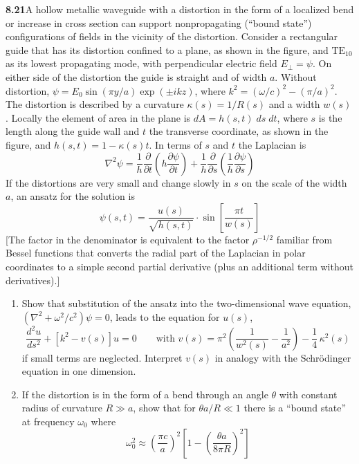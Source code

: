 \par\bigskip
\noindent\textbf{8.21}\quad A hollow metallic waveguide with a distortion in the form of a localized bend or increase in cross section can support nonpropagating (``bound state'') configurations of fields in the vicinity of the distortion. Consider a rectangular guide that has its distortion confined to a plane, as shown in the figure, and $\mathrm{TE}_{10}$ as its lowest propagating mode, with perpendicular electric field $E_{\perp}=\psi$. On either side of the distortion the guide is straight and of width $a$. Without distortion, $\psi=E_{0}\sin(\pi y/a)\exp(\pm ikz)$, where $k^{2}=(\omega/c)^{2}-(\pi/a)^{2}$. The distortion is described by a curvature $\kappa(s)=1/R(s)$ and a width $w(s)$. Locally the element of area in the plane is $dA=h(s,t)\;ds\;dt$, where $s$ is the length along the guide wall and $t$ the transverse coordinate, as shown in the figure, and $h(s,t)=1-\kappa(s)t$. In terms of $s$ and $t$ the Laplacian is
\[
\nabla^{2}\psi=\frac{1}{h}\frac{\partial}{\partial t}\left(h\frac{\partial\psi}{\partial t}\right)+\frac{1}{h}\frac{\partial}{\partial s}\left(\frac{1}{h}\frac{\partial\psi}{\partial s}\right)
\]
If the distortions are very small and change slowly in $s$ on the scale of the width $a$, an ansatz for the solution is
\[
\psi(s,t)=\frac{u(s)}{\sqrt{h(s,t)}}\cdot\sin\!\left[\frac{\pi t}{w(s)}\right]
\]
[The factor in the denominator is equivalent to the factor $\rho^{-1/2}$ familiar from Bessel functions that converts the radial part of the Laplacian in polar coordinates to a simple second partial derivative (plus an additional term without derivatives).]
\begin{enumerate}
\item[(a)] Show that substitution of the ansatz into the two-dimensional wave equation, $(\nabla^{2}+\omega^{2}/c^{2})\psi=0$, leads to the equation for $u(s)$,
\[
\frac{d^{2}u}{ds^{2}}+[k^{2}-v(s)]u=0\qquad\text{with }v(s)=\pi^{2}\!\left(\frac{1}{w^{2}(s)}-\frac{1}{a^{2}}\right)-\frac{1}{4}\,\kappa^{2}(s)
\]
if small terms are neglected. Interpret $v(s)$ in analogy with the Schr\"odinger equation in one dimension.
\item[(b)] If the distortion is in the form of a bend through an angle $\theta$ with constant radius of curvature $R\gg a$, show that for $\theta a/R\ll1$  there is a ``bound state'' at frequency $\omega_{0}$ where
\[
\omega_{0}^{2}\approx\left(\frac{\pi c}{a}\right)^{2}\!\left[1-\left(\frac{\theta a}{8\pi R}\right)^{2}\right]
\]
\end{enumerate}

